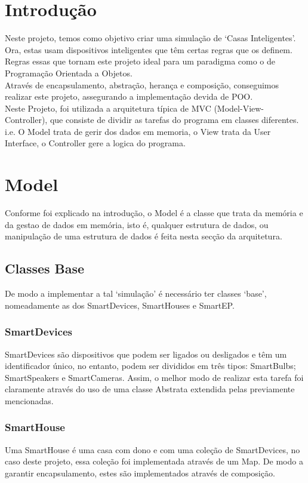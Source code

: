 \documentclass[10pt, a4paper]{article}
\begin{document}
\section{Introdução}
        Neste projeto, temos como objetivo criar uma simulação de `Casas Inteligentes'.\@
        Ora, estas usam dispositivos inteligentes que têm certas regras que os definem. Regras essas que tornam este projeto ideal para um paradigma como
        o de Programação Orientada a Objetos.\\
        Através de encapsulamento, abstração, herança e composição, conseguimos realizar este projeto, assegurando a implementação devida de POO.\@
        \\ Neste Projeto, foi utilizada a arquitetura típica de MVC (Model-View-Controller), que consiste de dividir as tarefas do programa em classes diferentes.\@
        i.e. O Model trata de gerir dos dados em memoria, o View trata da User Interface, o Controller gere a logica do programa.\@
\section{Model}
        Conforme foi explicado na introdução, o Model é a classe que trata da memória e da gestao de dados em memória, isto é, qualquer estrutura de dados,
        ou manipulação de uma estrutura de dados é feita nesta secção da arquitetura.
\subsection{Classes Base}
        De modo a implementar a tal `simulação' é necessário ter classes `base', nomeadamente as dos SmartDevices, SmartHouses e SmartEP.\@
\subsubsection{SmartDevices}
        SmartDevices são dispositivos que podem ser ligados ou desligados e têm um identificador único, no entanto, podem ser divididos em três tipos:
        SmartBulbs; SmartSpeakers e SmartCameras.
        Assim, o melhor modo de realizar esta tarefa foi claramente através do uso de uma classe Abstrata extendida pelas previamente mencionadas.
\subsubsection{SmartHouse}
        Uma SmartHouse é uma casa com dono e com uma coleção de SmartDevices, no caso deste projeto, essa coleção foi implementada através de um Map.
        De modo a garantir encapsulamento, estes são implementados através de composição.
\end{document}
